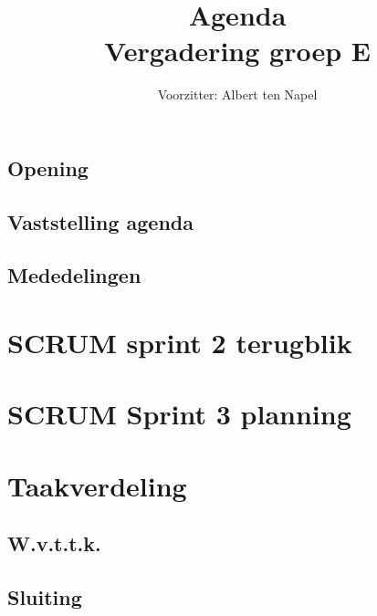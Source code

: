 \documentclass[a4paper]{article}
\title{Agenda \\ Vergadering groep E}
\author{Voorzitter: Albert ten Napel}
\begin{document}
\maketitle
\subsection*{Opening}
\subsection*{Vaststelling agenda}
\subsection*{Mededelingen}
\section{SCRUM sprint 2 terugblik}
\section{SCRUM Sprint 3 planning}
\section{Taakverdeling}
\subsection*{W.v.t.t.k.}
\subsection*{Sluiting}
\end{document}
